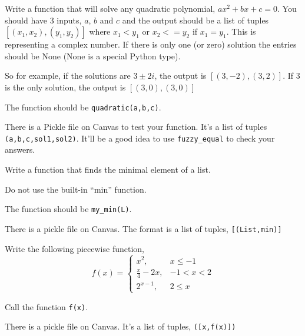\documentclass[11pt,letterpaper]{article}
\begin{document}
\begin{problem}
 Write a function that will solve any quadratic polynomial, $ax^2+bx+c=0$. You should have 3 inputs, 
$a$, $b$ and $c$ and the output should be a list of tuples $[(x_1,x_2),(y_1,y_2)]$ where $x_1<y_1$
or $x_2<=y_2$ if $x_1=y_1$. This is representing a complex number. If there is only one (or zero) 
solution the entries should be None (None is a special Python type).

So for example, if the solutions are $3\pm 2i$, the output is $[(3,-2),(3,2)]$. If $3$ is the 
only solution, the output is $[(3,0),(3,0)]$

The function should be \texttt{quadratic(a,b,c)}.

There is a Pickle file on Canvas to test your function. It's a list of tuples \texttt{(a,b,c,sol1,sol2)}. It'll be a good idea to use \texttt{fuzzy\_equal} to check your answers.
\end{problem}


\begin{problem}
Write a function that finds the minimal element of a list.

Do not use the built-in ``min'' function. 

The function should be \texttt{my\_min(L)}.

There is a pickle file on Canvas. The format is a list of tuples,
\texttt{[(List,min)]}
\end{problem}


\begin{problem}
Write the following piecewise function,
\[
f(x) = \left\{\begin{array}{ll} x^2, & x\le-1 \\ \frac{x}{4}-2x, & -1<x<2 \\ 2^{x-1}, & 2\le x \end{array}\right.
\]

Call the function \texttt{f(x)}.

There is a pickle file on Canvas. It's a list of tuples, \texttt{([x,f(x)])}

\end{problem}
\end{document}
